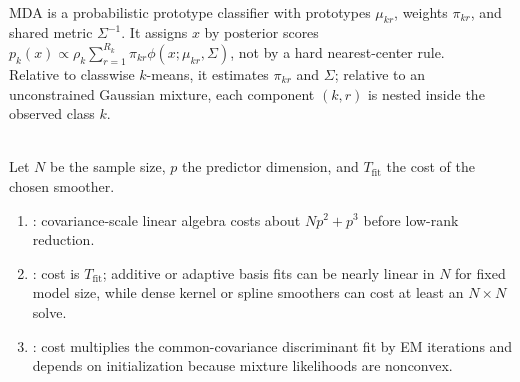 \begin{remark} \label{rem:sl-mda-versus-prototype-rules} \\
MDA is a probabilistic prototype classifier with prototypes $\mu_{kr}$, weights $\pi_{kr}$, and shared metric $\Sigma^{-1}$. It assigns $x$ by posterior scores $p_k(x)\propto \rho_k\sum_{r=1}^{R_k}\pi_{kr}\phi(x;\mu_{kr},\Sigma)$, not by a hard nearest-center rule.\\
Relative to classwise $k$-means, it estimates $\pi_{kr}$ and $\Sigma$; relative to an unconstrained Gaussian mixture, each component $(k,r)$ is nested inside the observed class $k$.
\end{remark}

\begin{remark} \label{rem:sl-discriminant-methods-computation} \\
Let $N$ be the sample size, $p$ the predictor dimension, and $T_{\mathrm{fit}}$ the cost of the chosen smoother.
\begin{enumerate}[label=(\roman*)]
\setlength{\itemsep}{0pt}
\item {}: covariance-scale linear algebra costs about $Np^2+p^3$ before low-rank reduction.
\item {}: cost is $T_{\mathrm{fit}}$; additive or adaptive basis fits can be nearly linear in $N$ for fixed model size, while dense kernel or spline smoothers can cost at least an $N\times N$ solve.
\item {}: cost multiplies the common-covariance discriminant fit by EM iterations and depends on initialization because mixture likelihoods are nonconvex.
\end{enumerate}
\end{remark}
